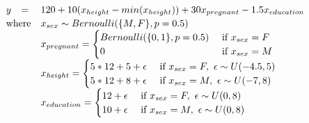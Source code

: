 \documentclass[12pt]{article}
\newcommand{\cut}[1]{}
\begin{document}
\begin{equation}\label{eq:weight}
\begin{array}{rll}
y & = &120 + 10(x_{height} - min(x_{height})) + 30x_{pregnant} - 1.5x_{education}\\
\vspace{-10pt}\\
\multicolumn{2}{r}{\text{where}} & x_{sex} \sim Bernoulli(\{M,F\}, p=0.5)\\
                    & & x_{pregnant} = \begin{cases}
                                               Bernoulli(\{0,1\},p=0.5) & \text{ if } x_{sex} = F\\
                                               0 & \text{ if } x_{sex}=M\\
                                               \end{cases}\\
                    & & x_{height} = \begin{cases}
                                               5*12+5+ \epsilon & \text{ if } x_{sex}=F,~ \epsilon \sim U(-4.5,5)\\	
                                               5*12+8 + \epsilon & \text{ if } x_{sex}=M,~ \epsilon \sim U(-7,8)\\
                                               \end{cases}\\
                    & & x_{education} = \begin{cases}
                                               12 + \epsilon & \text{ if } x_{sex}=F,~ \epsilon \sim U(0,8)\\	
                                               10 + \epsilon & \text{ if } x_{sex}=M,~ \epsilon \sim U(0,8)\\
                                               \end{cases}
\end{array}
\end{equation}

\cut{
def toy_weight_data(n):
    df = pd.DataFrame()
    nmen = n//2
    nwomen = n//2
    df['sex'] = ['M']*nmen + ['F']*nwomen
    df.loc[df['sex']=='F','pregnant'] = np.random.randint(0,2,size=(nwomen,))
    df.loc[df['sex']=='M','pregnant'] = 0
    df.loc[df['sex']=='M','height'] = 5*12+8 + np.random.uniform(-7, +8, size=(nmen,))
    df.loc[df['sex']=='F','height'] = 5*12+5 + np.random.uniform(-4.5, +5, size=(nwomen,))
    df.loc[df['sex']=='M','education'] = 10 + np.random.randint(0,8,size=nmen)
    df.loc[df['sex']=='F','education'] = 12 + np.random.randint(0,8,size=nwomen)
}
\end{document}
